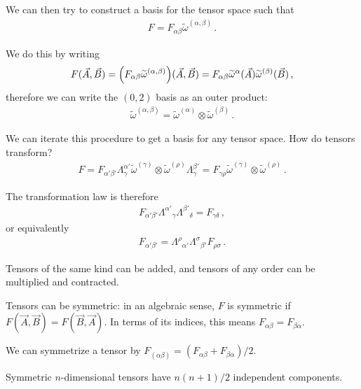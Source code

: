 \documentclass[main.tex]{subfiles}
\begin{document}
We can then try to construct a basis for the tensor space such that 
%
\begin{align}
F = F_{\alpha \beta } \widetilde{\omega}^{(\alpha , \beta )}
\,.
\end{align}

We do this by writing 
%
\begin{align}
F (\vec{A}, \vec{B}) 
= \qty(F_{\alpha \beta } \widetilde{\omega}^{(\alpha , \beta )}) (\vec{A}, \vec{B})
= F_{\alpha \beta } \widetilde{\omega}^{\alpha }(\vec{A}) \widetilde{\omega}^{(\beta )}(\vec{B})
\,,
\end{align}
%
therefore we can write the \((0, 2)\) basis as an outer product: 
%
\begin{align}
\widetilde{\omega}^{(\alpha , \beta )} = \widetilde{\omega}^{(\alpha)} \otimes \widetilde{\omega}^{(\beta )} 
\,.
\end{align}

We can iterate this procedure to get a basis for any tensor space. How do tensors transform? 
%
\begin{align}
F = F_{\alpha ' \beta '} \Lambda^{\alpha '}_{\gamma } \widetilde{\omega}^{(\gamma )} \otimes 
\widetilde{\omega}^{(\rho )} \Lambda^{\beta '}_{\gamma }
= F_{\gamma \rho } \widetilde{\omega}^{(\gamma )} \otimes \widetilde{\omega}^{(\rho )}
\,.
\end{align}
%

The transformation law is therefore 
%
\begin{align}
F_{\alpha ' \beta '} \Lambda^{\alpha '}{}_\gamma \Lambda^{\beta '}{}_\delta = F_{\gamma \delta }
\,,
\end{align}
%
or equivalently 
%
\begin{align}
F_{\alpha ' \beta ' } = \Lambda^{\rho }{}_{\alpha '} \Lambda^{\sigma }{}_{\beta '} F_{ \rho \sigma }
\,.
\end{align}

Tensors of the same kind can be added, and tensors of any order can be multiplied and contracted. 

Tensors can be symmetric: in an algebraic sense, \(F\) is symmetric if \(F(\vec{A}, \vec{B}) = F(\vec{B}, \vec{A})\). 
In terms of its indices, this means \(F_{\alpha \beta } = F_{\beta \alpha }\). 

We can symmetrize a tensor by \(F_{(\alpha \beta )} = (F_{\alpha \beta } + F_{\beta \alpha }) / 2\). 

Symmetric \(n\)-dimensional  tensors have \(n(n+1) / 2\) independent components. 
\end{document}
